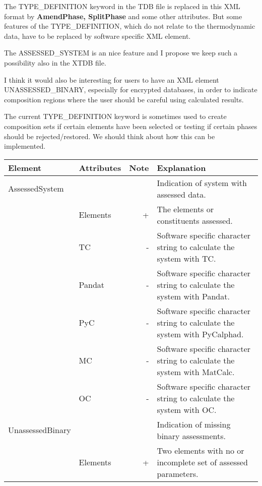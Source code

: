 \documentclass{article}
\begin{document}
The TYPE\_DEFINITION keyword in the TDB file is replaced in this XML
format by {\bf AmendPhase, SplitPhase} and some other attributes.  But
some features of the TYPE\_DEFINITION, which do not relate to the
thermodynamic data, have to be replaced by software specific XML
element.

The ASSESSED\_SYSTEM is an nice feature and I propose we keep such a
possibility also in the XTDB file.

I think it would also be interesting for users to have an XML element
UNASSESSED\_BINARY, especially for encrypted databases, in order to
indicate composition regions where the user should be careful using
calculated results.

The current TYPE\_DEFINITION keyword is sometimes used to create
composition sets if certain elements have been selected or testing if
certain phases should be rejected/restored.  We should think about how
this can be implemented.

\bigskip
\begin{tabular}{|p{} p{} r p{}|}\hline
  Element & Attributes & Note & Explanation\\\hline

  AssessedSystem & & & Indication of system with assessed data.\\
      & Elements & + & The elements or constituents assessed.\\
      & TC & - & Software specific character string to calculate the system with TC.\\
      & Pandat & - & Software specific character string to calculate the system with Pandat.\\
      & PyC & - & Software specific character string to calculate the system with PyCalphad.\\
      & MC & - & Software specific character string to calculate the system with MatCalc.\\
      & OC & - & Software specific character string to calculate the system with OC.\\\hline

  UnassessedBinary & & & Indication of missing binary assessments.\\
       & Elements & + & Two elements with no or incomplete set of assessed
 parameters.\\\hline


 
\end{tabular}
\end{document}
